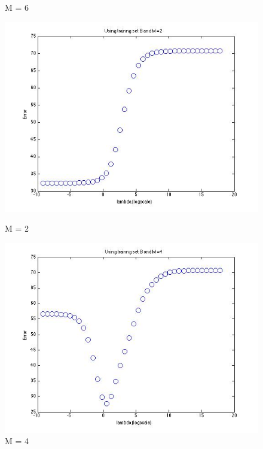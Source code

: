 \begin{figure}[!htb]
  \caption{M = 6}\label{fig:figures/p3_regressA_m=6}
\endminipage
\end{figure}


\begin{figure}[!htb]
  \includegraphics[width=\linewidth]{figures/p3_regressB_m=2}
  \caption{M = 2}\label{fig:figures/p3_regressB_m=2}
\endminipage\hfill
{}
  \includegraphics[width=\linewidth]{figures/p3_regressB_m=4}
  \caption{M = 4}\label{fig:figures/p3_regressB_m=4}
\endminipage\hfill
{}%

\end{figure}
